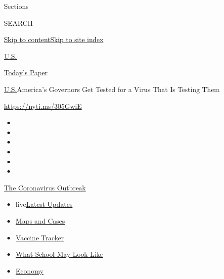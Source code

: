 Sections

SEARCH

\protect\hyperlink{site-content}{Skip to
content}\protect\hyperlink{site-index}{Skip to site index}

\href{https://www.nytimes.com/section/us}{U.S.}

\href{https://myaccount.nytimes.com/auth/login?response_type=cookie\&client_id=vi}{}

\href{https://www.nytimes.com/section/todayspaper}{Today's Paper}

\href{/section/us}{U.S.}\textbar{}America's Governors Get Tested for a
Virus That Is Testing Them

\url{https://nyti.ms/305GwiE}

\begin{itemize}
\item
\item
\item
\item
\item
\item
\end{itemize}

\href{https://www.nytimes.com/news-event/coronavirus?action=click\&pgtype=Article\&state=default\&region=TOP_BANNER\&context=storylines_menu}{The
Coronavirus Outbreak}

\begin{itemize}
\tightlist
\item
  live\href{https://www.nytimes.com/2020/08/01/world/coronavirus-covid-19.html?action=click\&pgtype=Article\&state=default\&region=TOP_BANNER\&context=storylines_menu}{Latest
  Updates}
\item
  \href{https://www.nytimes.com/interactive/2020/us/coronavirus-us-cases.html?action=click\&pgtype=Article\&state=default\&region=TOP_BANNER\&context=storylines_menu}{Maps
  and Cases}
\item
  \href{https://www.nytimes.com/interactive/2020/science/coronavirus-vaccine-tracker.html?action=click\&pgtype=Article\&state=default\&region=TOP_BANNER\&context=storylines_menu}{Vaccine
  Tracker}
\item
  \href{https://www.nytimes.com/interactive/2020/07/29/us/schools-reopening-coronavirus.html?action=click\&pgtype=Article\&state=default\&region=TOP_BANNER\&context=storylines_menu}{What
  School May Look Like}
\item
  \href{https://www.nytimes.com/live/2020/07/31/business/stock-market-today-coronavirus?action=click\&pgtype=Article\&state=default\&region=TOP_BANNER\&context=storylines_menu}{Economy}
\end{itemize}

